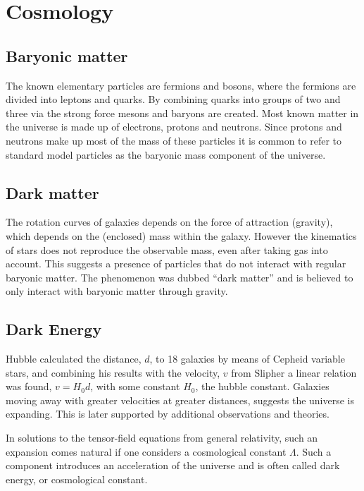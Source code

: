 \section{Cosmology}

\subsection{Baryonic matter}
The known elementary particles are fermions and bosons, where the fermions are divided into leptons and quarks.
By combining quarks into groups of two and three via the strong force mesons and baryons are created.
Most known matter in the universe is made up of electrons, protons and neutrons. Since protons and neutrons make up most of the mass of these particles it is common to refer to standard model particles as the baryonic mass component of the universe.

\subsection{Dark matter}
The rotation curves of galaxies depends on the force of attraction (gravity), which depends on the (enclosed) mass within the galaxy.
However the kinematics of stars does not reproduce the observable mass, even after taking gas into account. This suggests a presence of particles that do not interact with regular baryonic matter. The phenomenon was dubbed ``dark matter'' and is believed to only interact with baryonic matter through gravity.

\subsection{Dark Energy}
Hubble calculated the distance, $d$, to 18 galaxies by means of Cepheid variable stars, and combining his results with the velocity, $v$ from Slipher a linear relation was found, $v=H_0d$, with some constant $H_0$, the hubble constant.
Galaxies moving away with greater velocities at greater distances, suggests the universe is expanding.
This is later supported by additional observations and theories.

In solutions to the tensor-field equations from general relativity, such an expansion comes natural if one considers a cosmological constant $\Lambda$. Such a component introduces an acceleration of the universe and is often called dark energy, or cosmological constant.

